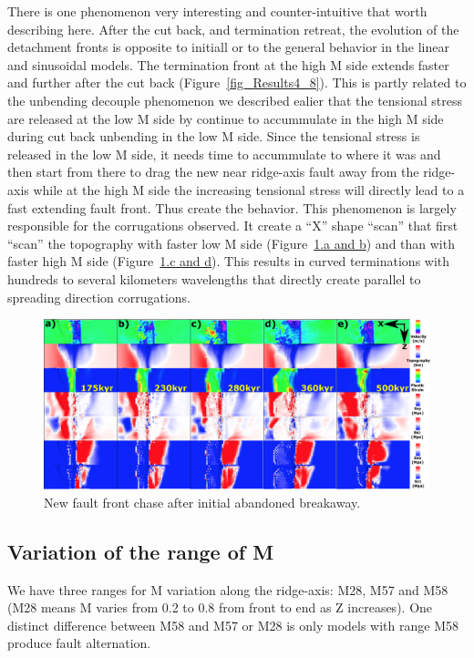 There is one phenomenon very interesting and counter-intuitive that worth describing here. After the cut back, and termination retreat, the evolution of the detachment fronts is opposite to initiall or to the general behavior in the linear and sinusoidal models. The termination front at the high M side extends faster and further after the cut back (Figure~\hyperref[fig_Results4_8]{\ref{fig_Results4_8}}). This is partly related to the unbending decouple phenomenon we described ealier that the tensional stress are released at the low M side by continue to accummulate in the high M side during cut back unbending in the low M side. Since the tensional stress is released in the low M side, it needs time to accummulate to where it was and then start from there to drag the new near ridge-axis fault away from the ridge-axis while at the high M side the increasing tensional stress will directly lead to a fast extending fault front. Thus create the behavior.  This phenomenon is largely responsible for the corrugations observed. It create a ``X'' shape ``scan'' that first ``scan'' the topography with faster low M side (Figure~\hyperref[fig_Results4_9]{\ref{fig_Results4_9}.a and b}) and than with faster high M side (Figure~\hyperref[fig_Results4_9]{\ref{fig_Results4_9}.c and d}). This results in curved terminations with hundreds to several kilometers wavelengths that directly create parallel to spreading direction corrugations.    

\begin{figure}[hc]
  \centering
    \includegraphics[width=1.0\textwidth]{fig_Results4_9_sqrt_cut_back_new_fault_chase.eps}
  \caption{New fault front chase after initial abandoned breakaway.}
 \label{fig_Results4_9}
\end{figure}
  
\subsection{Variation of the range of M}
We have three ranges for M variation along the ridge-axis: M28, M57 and M58 (M28 means M varies from 0.2 to 0.8 from front to end as Z increases). One distinct difference between M58 and M57 or M28 is only models with range M58 produce fault alternation.


